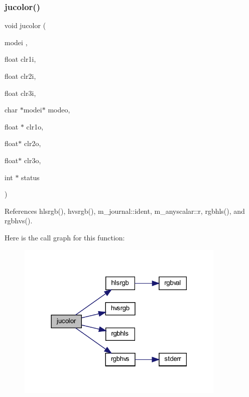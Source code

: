 \subsubsection{\texorpdfstring{jucolor()}{jucolor()}}
{\footnotesize\ttfamily void jucolor (\begin{DoxyParamCaption}\item[{modei}]{,  }\item[{float}]{clr1i,  }\item[{float}]{clr2i,  }\item[{float}]{clr3i,  }\item[{char $\ast$modei$\ast$}]{modeo,  }\item[{float $\ast$}]{clr1o,  }\item[{float$\ast$}]{clr2o,  }\item[{float$\ast$}]{clr3o,  }\item[{int $\ast$}]{status }\end{DoxyParamCaption})}



References hlsrgb(), hvsrgb(), m\+\_\+journal\+::ident, m\+\_\+anyscalar\+::r, rgbhls(), and rgbhvs().

Here is the call graph for this function\+:
\nopagebreak
\begin{figure}[H]
\begin{center}
\leavevmode
\includegraphics[width=282pt]{C-jucolor_8c_ab1a7b686c79343455799a5c44294194b_cgraph}
\end{center}
\end{figure}
